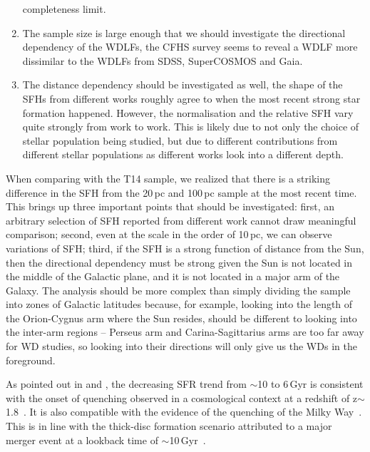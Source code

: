 \documentclass[fleqn,usenatbib]{mnras}
\begin{document}
\begin{enumerate}
    completeness limit.
    \item The sample size is large enough that we should investigate the
    directional dependency of the WDLFs, the CFHS survey seems to reveal a
    WDLF more dissimilar to the WDLFs from SDSS, SuperCOSMOS and Gaia.
    \item The distance dependency should be investigated as well, the shape of
    the SFHs from different works roughly agree to when the most recent strong
    star formation happened. However, the normalisation and the relative SFH
    vary quite strongly from work to work. This is likely due to not only the
    choice of stellar population being studied, but due to different
    contributions from different stellar populations as different works look
    into a different depth.
\end{enumerate}

When comparing with the T14 sample, we realized that there is a striking 
difference in the SFH from the 20\,pc and 100\,pc sample at the most recent
time. This brings up three important points that should be investigated: first,
an arbitrary selection of SFH reported from different work cannot draw
meaningful comparison; second, even at the scale in the order of 10\,pc, we
can observe variations of SFH; third, if the SFH is a strong function of
distance from the Sun, then the directional dependency must be strong given the
Sun is not located in the middle of the Galactic plane, and it is not located
in a major arm of the Galaxy. The analysis should be more complex than simply
dividing the sample into zones of Galactic latitudes because, for example,
looking into the length of the Orion-Cygnus arm where the Sun resides, should
be different to looking into the inter-arm regions -- Perseus arm and
Carina-Sagittarius arms are too far away for WD studies, so looking into their
directions will only give us the WDs in the foreground.

As pointed out in \citet{2019A&A...624L...1M} and \citet{2019ApJ...878L..11I},
the decreasing SFR trend from $\sim$10 to 6\,Gyr is consistent with the
onset of quenching observed in a cosmological context at a redshift of
z$\sim$1.8~\citep[corresponds to a lookback time of
$\sim$10\,Gyr, e.g.][]{2016MNRAS.461.1100R, 2017MNRAS.471.4155K}. It is
also compatible with the evidence of the quenching of the Milky
Way~\citep{2016A&A...589A..66H}. This is in line with the thick-disc formation
scenario attributed to a major merger event at a lookback time of 
$\sim$10\,Gyr~\citep{2018Natur.563...85H}.
\end{document}
